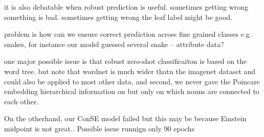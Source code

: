 \documentclass[12pt]{report}
\begin{document}
it is also debatable when robust prediction is useful. sometimes getting wrong something is bad. sometimes getting wrong the leaf label might be good.

problem is how can we ensure correct prediction across fine grained classes e.g. snakes, for instance our model guessed several snake -- attribute data? 


one major possible issue is that robust zero-shot classificaiton is based on the word tree. but note that wordnet is much wider thatn the imagenet dataset and could also be applied to most other data, and second, we never gave the Poincare embedding hierarchical information on but only on which nouns are connected to each other.

On the otherhand, our ConSE model failed but this may be because Einstein midpoint is not great..  
Possible issue runnign only 90 epochs



\end{document}
